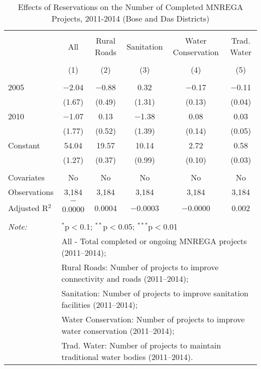 
\begin{table}[!htbp] \centering 
  \caption{Effects of Reservations on the Number of Completed MNREGA Projects, 2011-2014 (Bose and Das Districts)} 
  \label{mnrega_up_bd_districts_05_10} 
\scriptsize 
\begin{tabular}{@{\extracolsep{0pt}}lccccc} 
\\[-1.8ex]\hline 
\hline \\[-1.8ex] 
 & All & Rural Roads & Sanitation & Water Conservation & Trad. Water \\ 
\\[-1.8ex] & (1) & (2) & (3) & (4) & (5)\\ 
\hline \\[-1.8ex] 
 2005 & $-$2.04 & $-$0.88 & 0.32 & $-$0.17 & $-$0.11 \\ 
  & (1.67) & (0.49) & (1.31) & (0.13) & (0.04) \\ 
  2010 & $-$1.07 & 0.13 & $-$1.38 & 0.08 & 0.03 \\ 
  & (1.77) & (0.52) & (1.39) & (0.14) & (0.05) \\ 
  Constant & 54.04 & 19.57 & 10.14 & 2.72 & 0.58 \\ 
  & (1.27) & (0.37) & (0.99) & (0.10) & (0.03) \\ 
 \hline \\[-1.8ex] 
Covariates & No & No & No & No & No \\ 
Observations & 3,184 & 3,184 & 3,184 & 3,184 & 3,184 \\ 
Adjusted R$^{2}$ & $-$0.0000 & 0.0004 & $-$0.0003 & $-$0.0000 & 0.002 \\ 
\hline 
\hline \\[-1.8ex] 
\textit{Note:}  & \multicolumn{5}{l}{$^{*}$p$<$0.1; $^{**}$p$<$0.05; $^{***}$p$<$0.01} \\ 
 & \multicolumn{5}{l}{All - Total completed or ongoing MNREGA projects (2011--2014);} \\ 
 & \multicolumn{5}{l}{Rural Roads: Number of projects to improve connectivity and roads (2011--2014);} \\ 
 & \multicolumn{5}{l}{Sanitation:  Number of projects to improve sanitation facilities  (2011--2014);} \\ 
 & \multicolumn{5}{l}{Water Conservation: Number of projects to improve water conservation (2011--2014);} \\ 
 & \multicolumn{5}{l}{Trad. Water: Number of projects to maintain traditional water bodies (2011--2014).} \\ 
\end{tabular} 
\end{table} 
